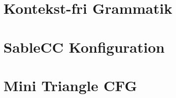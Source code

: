 \appendix


\chapter{Kontekst-fri Grammatik}
\label{bil:cfg}


\label{FIRSTAPPENDIX} %

\chapter{SableCC Konfiguration}
\label{bil:sablecc}



\chapter{Mini Triangle CFG}
\label{bil:minitriangle}


%

\label{LASTAPPENDIX}
